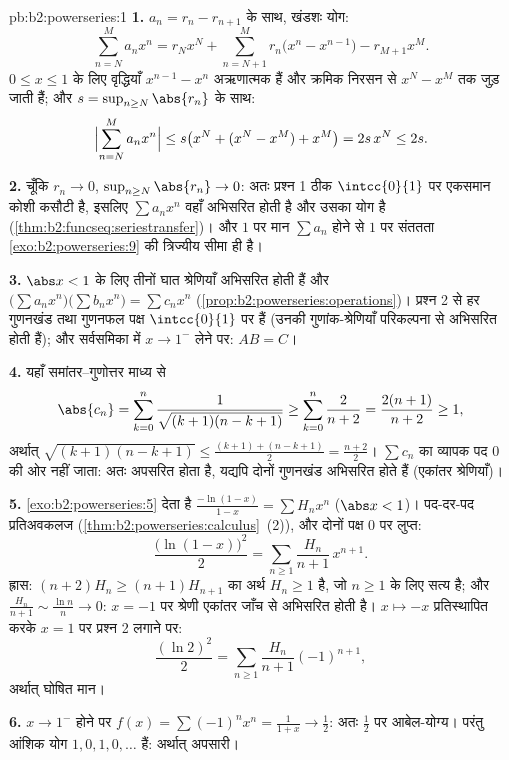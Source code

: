 \begin{solution}{pb:b2:powerseries:1}
\textbf{1.} $a_n = r_n - r_{n+1}$ के साथ, खंडशः योग:
\[
\sum_{n=N}^{M} a_nx^n
= r_Nx^N + \sum_{n=N+1}^{M} r_n\bigl(x^n - x^{n-1}\bigr)
- r_{M+1}x^M .
\]
$0 \leq x \leq 1$ के लिए वृद्धियाँ $x^{n-1} - x^n$ अऋणात्मक हैं और क्रमिक निरसन से $x^N - x^M$ तक जुड़ जाती
हैं; और $s = \sup_{n\geq
N}\abs{r_n}$ के साथ:
\[
\Bigl|\sum_{n=N}^{M}a_nx^n\Bigr|
\leq s\bigl(x^N + (x^N - x^M) + x^M\bigr) = 2s\,x^N \leq 2s .
\]

\textbf{2.} चूँकि $r_n \to 0$, $\sup_{n\geq N}\abs{r_n} \to 0$: अतः प्रश्न 1 ठीक $\intcc{0}{1}$ पर एकसमान कोशी कसौटी है,
इसलिए $\sum a_nx^n$ वहाँ  अभिसरित होती है और उसका योग  है (\cref{thm:b2:funcseq:seriestransfer})।
और $1$ पर मान $\sum a_n$ होने से $1$ पर संततता \cref{exo:b2:powerseries:9} की त्रिज्यीय सीमा ही है।

\textbf{3.} $\abs x < 1$ के लिए तीनों घात श्रेणियाँ  अभिसरित होती
हैं और $\bigl(\sum a_nx^n\bigr)\bigl(\sum b_nx^n\bigr)
= \sum c_nx^n$ (\cref{prop:b2:powerseries:operations})। प्रश्न 2 से हर गुणनखंड तथा गुणनफल पक्ष $\intcc{0}{1}$ पर  हैं
(उनकी गुणांक-श्रेणियाँ परिकल्पना से अभिसरित होती हैं); और सर्वसमिका में
$x \to 1^-$ लेने पर: $AB = C$।

\textbf{4.} यहाँ समांतर--गुणोत्तर माध्य से
\[
\abs{c_n} = \sum_{k=0}^{n}
\frac{1}{\sqrt{(k+1)(n-k+1)}}
\geq \sum_{k=0}^{n}\frac{2}{n+2}
= \frac{2(n+1)}{n+2} \geq 1,
\]
अर्थात् $\sqrt{(k+1)(n-k+1)} \leq \frac{(k+1) +
(n-k+1)}{2} = \frac{n+2}{2}$। $\sum c_n$ का व्यापक पद $0$ की ओर नहीं जाता: अतः 
अपसरित होता है, यद्यपि दोनों गुणनखंड अभिसरित होते हैं (एकांतर श्रेणियाँ)।

\textbf{5.} \cref{exo:b2:powerseries:5} देता है $\frac{-\ln(1-x)}{1-x} = \sum H_nx^n$ ($\abs x < 1$)। पद-दर-पद प्रतिअवकलज (\cref{thm:b2:powerseries:calculus}~(2)), और
दोनों पक्ष $0$ पर लुप्त:
\[
\frac{\bigl(\ln(1-x)\bigr)^2}{2}
= \sum_{n\geq1}\frac{H_n}{n+1}\,x^{n+1} .
\]
ह्रास: $(n+2)H_n \geq (n+1)H_{n+1}$ का अर्थ $H_n \geq
1$ है, जो $n \geq 1$ के लिए सत्य है; और $\frac{H_n}{n+1} \sim \frac{\ln
n}{n} \to 0$: $x = -1$ पर श्रेणी
एकांतर जाँच से अभिसरित होती है। $x \mapsto -x$ प्रतिस्थापित करके $x = 1$ पर प्रश्न 2
लगाने पर:
\[
\frac{(\ln 2)^2}{2}
= \sum_{n\geq1}\frac{H_n}{n+1}(-1)^{n+1},
\]
अर्थात् घोषित मान।

\textbf{6.} $x \to 1^-$ होने पर $f(x) = \sum(-1)^nx^n = \frac{1}{1+x} \to \frac12$: अतः $\frac12$ पर आबेल-योग्य। परंतु आंशिक योग $1, 0, 1, 0, \dots$
हैं: अर्थात् अपसारी।


\end{solution}
